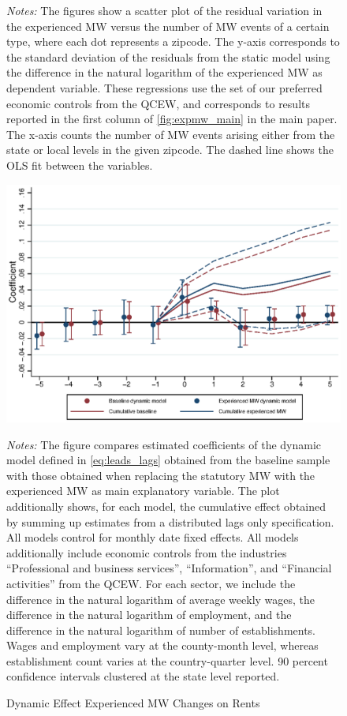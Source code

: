 \begin{figure}[htb!]
\begin{minipage}{\textwidth}
		\vspace{3mm}	
		\textit{Notes:} The figures show a scatter plot of the residual variation in the 
		experienced MW versus the number of MW events of a certain type, where each dot represents 
		a zipcode. The y-axis corresponds to the standard deviation of the residuals from the static 
		model using the difference in the natural logarithm of the experienced MW as dependent variable. 
		These regressions use the set of our preferred economic controls from the QCEW, and corresponds 
		to results reported in the first column of \autoref{fig:expmw_main} in the main paper. The 
		x-axis counts the number of MW events arising either from the state or local levels in the 
		given zipcode. The dashed line shows the OLS fit between the variables.
	\end{minipage}
\end{figure}

\begin{figure}[!h]
	\centering
	\caption{Dynamic Effect Experienced MW Changes on Rents}
	\label{fig:expmw_dynamic}
	\includegraphics[width = .9\textwidth]
		{../../analysis/first_differences_expmw/output/fd_model_comparison_expmw.eps}
	\begin{minipage}{.9\textwidth}\footnotesize
		\textit{Notes:} The figure compares estimated coefficients of the dynamic model defined in 
		\autoref{eq:leads_lags} obtained from the baseline sample with those obtained when replacing 
		the statutory MW with the experienced MW as main explanatory variable. The plot additionally 
		shows, for each model, the cumulative effect obtained by summing up estimates from a 
		distributed lags only specification. All models control for monthly date fixed effects. 
		All models additionally include economic controls from the industries ``Professional and 
		business services'', ``Information'', and ``Financial activities'' from the QCEW. For each
		sector, we include the difference in the natural logarithm of average weekly wages, the 
		difference in the natural logarithm of employment, and the difference in the natural 
		logarithm of number of establishments. Wages and employment vary at the county-month level,
		whereas establishment count varies at the country-quarter level.
		90 percent confidence intervals clustered at the state level reported. 
	\end{minipage}
\end{figure}


